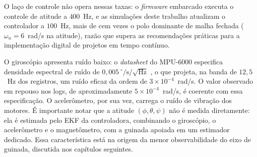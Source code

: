 O laço de controle não opera nessas taxas: o \textit{firmware} embarcado executa o controle de atitude a $400$~Hz, e as simulações deste trabalho atualizam o controlador a $100$~Hz, mais de cem vezes o polo dominante de malha fechada ($\omega_n = 6$~rad/s na atitude), razão que supera as recomendações práticas para a implementação digital de projetos em tempo contínuo.

O giroscópio apresenta ruído baixo: o \textit{datasheet} do MPU-6000 especifica densidade espectral de ruído de $0{,}005~^{\circ}/\mathrm{s}/\sqrt{\mathrm{Hz}}$ \cite{Invensense2013}, o que projeta, na banda de $12{,}5$~Hz dos registros, um ruído eficaz da ordem de $3\times10^{-4}$~rad/s. O valor observado em repouso nos logs, de aproximadamente $5\times10^{-4}$~rad/s, é coerente com essa especificação. O acelerômetro, por sua vez, carrega o ruído de vibração dos motores. É importante notar que a atitude $(\phi,\theta,\psi)$ não é medida diretamente: ela é estimada pelo EKF da controladora, combinando o giroscópio, o acelerômetro e o magnetômetro, com a guinada apoiada em um estimador dedicado. Essa característica está na origem da menor observabilidade do eixo de guinada, discutida nos capítulos seguintes.
